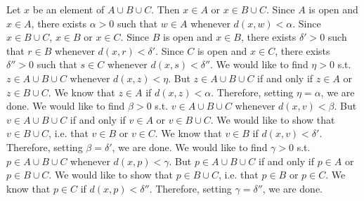 \documentclass[a4paper,twoside,12pt]{article} %
\makeatletter
\DeclareRobustCommand{\_}{%
  \leavevmode\vbox{%
    \hrule\@width.4em
          \@height-.16ex
          \@depth\dimexpr.16ex+.28pt\relax}}
\makeatother
\begin{document}
\begin{center}
\begin{minipage}{120mm}
Let $x$ be an element of $A\cup B\cup C$. Then $x\in A$ or $x\in B\cup C$. Since $A$ is open and $x\in A$, there exists $\alpha > 0$ such that $w\in A$\textrm{ whenever }$\textit{d}(x,w) < \alpha$. Since $x\in B\cup C$, $x\in B$ or $x\in C$. Since $B$ is open and $x\in B$, there exists $\delta' > 0$ such that $r\in B$\textrm{ whenever }$\textit{d}(x,r) < \delta'$. Since $C$ is open and $x\in C$, there exists $\delta'' > 0$ such that $s\in C$\textrm{ whenever }$\textit{d}(x,s) < \delta''$. We would like to find $\eta > 0$ s.t. $z\in A\cup B\cup C$\textrm{ whenever }$\textit{d}(x,z) < \eta$. But $z\in A\cup B\cup C$ if and only if $z\in A$ or $z\in B\cup C$. We know that $z\in A$ if $\textit{d}(x,z) < \alpha$. Therefore, setting $\eta = \alpha$, we are done. We would like to find $\beta > 0$ s.t. $v\in A\cup B\cup C$\textrm{ whenever }$\textit{d}(x,v) < \beta$. But $v\in A\cup B\cup C$ if and only if $v\in A$ or $v\in B\cup C$. We would like to show that $v\in B\cup C$, i.e. that $v\in B$ or $v\in C$. We know that $v\in B$ if $\textit{d}(x,v) < \delta'$. Therefore, setting $\beta = \delta'$, we are done. We would like to find $\gamma > 0$ s.t. $p\in A\cup B\cup C$\textrm{ whenever }$\textit{d}(x,p) < \gamma$. But $p\in A\cup B\cup C$ if and only if $p\in A$ or $p\in B\cup C$. We would like to show that $p\in B\cup C$, i.e. that $p\in B$ or $p\in C$. We know that $p\in C$ if $\textit{d}(x,p) < \delta''$. Therefore, setting $\gamma = \delta''$, we are done.
\end{minipage}
\end{center}
\end{document}
